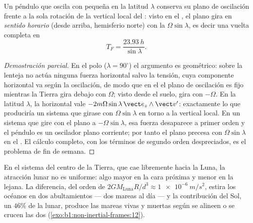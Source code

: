 \begin{proposition}\label{prop:b1:non-inertial-frames:foucault}
Un péndulo que oscila con pequeña  en la latitud $\lambda$
conserva su plano de oscilación frente a la sola rotación de la vertical
local del : visto en el , el plano
gira en \emph{sentido horario} (desde arriba, hemisferio norte) con la
 $\Omega\sin\lambda$, es decir una vuelta completa en
\[
T_F = \frac{\qty{23.93}{h}}{\sin\lambda} .
\]
\end{proposition}

\begin{proof}[Demostración parcial]
En el polo ($\lambda = 90^\circ$) el argumento es geométrico: sobre la
lenteja no actúa ninguna fuerza horizontal salvo la tensión, cuya
componente horizontal va según la oscilación, de modo que en el  el plano de oscilación es fijo mientras la Tierra gira debajo
con $\Omega$; visto desde el suelo, gira con $-\Omega$. En la latitud
$\lambda$, la  horizontal vale
$-2m\Omega\sin\lambda\,\vect e_z\wedge\vect v'$: exactamente lo que produciría un
sistema que girase con $\Omega\sin\lambda$ en torno a la vertical local. En un
sistema que gire con el plano a $-\Omega\sin\lambda$, esa fuerza desaparece a
primer orden y el péndulo es un oscilador plano corriente; por tanto el
plano precesa con $\Omega\sin\lambda$ en el . El cálculo
completo, con los términos de segundo orden despreciados, es el problema
de fin de semana.
\end{proof}

\begin{remark}\label{rem:b1:non-inertial-frames:tides}
En el sistema del centro de la Tierra, que cae libremente hacia la Luna,
la atracción lunar no es uniforme: algo mayor en la cara próxima y menor
en la lejana. La diferencia, del orden de $2GM_{\text{Luna}}R/d^3
\approx \qty{1e-6}{m/s^2}$, estira los océanos en dos abultamientos ---
dos mareas al día --- y la contribución del Sol, un $46\%$ de la lunar,
produce las mareas vivas y muertas según se alineen o se crucen las dos
(\cref{exo:b1:non-inertial-frames:12}).
\end{remark}

